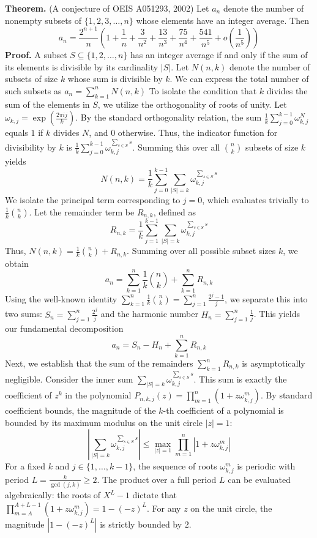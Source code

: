 \textbf{Theorem. } (A conjecture of OEIS A051293, 2002) Let $a_n$ denote the number of nonempty subsets of $\{1, 2, 3, \dots, n\}$ whose elements have an integer average. Then
$$ a_n = \frac{2^{n+1}}{n} \left( 1 + \frac{1}{n} + \frac{3}{n^2} + \frac{13}{n^3} + \frac{75}{n^4} + \frac{541}{n^5} + o\left(\frac{1}{n^5}\right) \right) $$
\textbf{Proof.} A subset $S \subseteq \{1, 2, \dots, n\}$ has an integer average if and only if the sum of its elements is divisible by its cardinality $|S|$. Let $N(n, k)$ denote the number of subsets of size $k$ whose sum is divisible by $k$. We can express the total number of such subsets as $a_n = \sum_{k=1}^n N(n, k)$
To isolate the condition that $k$ divides the sum of the elements in $S$, we utilize the orthogonality of roots of unity. Let $\omega_{k, j} = \exp\left(\frac{2\pi i j}{k}\right)$. By the standard orthogonality relation, the sum $\frac{1}{k} \sum_{j=0}^{k-1} \omega_{k, j}^N$ equals $1$ if $k$ divides $N$, and $0$ otherwise. Thus, the indicator function for divisibility by $k$ is $\frac{1}{k} \sum_{j=0}^{k-1} \omega_{k, j}^{\sum_{s \in S} s}$. Summing this over all $\binom{n}{k}$ subsets of size $k$ yields
$$ N(n, k) = \frac{1}{k} \sum_{j=0}^{k-1} \sum_{|S|=k} \omega_{k, j}^{\sum_{s \in S} s} $$
We isolate the principal term corresponding to $j = 0$, which evaluates trivially to $\frac{1}{k} \binom{n}{k}$. Let the remainder term be $R_{n,k}$, defined as
$$ R_{n,k} = \frac{1}{k} \sum_{j=1}^{k-1} \sum_{|S|=k} \omega_{k, j}^{\sum_{s \in S} s} $$
Thus, $N(n, k) = \frac{1}{k} \binom{n}{k} + R_{n,k}$. Summing over all possible subset sizes $k$, we obtain
$$ a_n = \sum_{k=1}^n \frac{1}{k} \binom{n}{k} + \sum_{k=1}^n R_{n,k} $$
Using the well-known identity $\sum_{k=1}^n \frac{1}{k} \binom{n}{k} = \sum_{j=1}^n \frac{2^j - 1}{j}$, we separate this into two sums: $S_n = \sum_{j=1}^n \frac{2^j}{j}$ and the harmonic number $H_n = \sum_{j=1}^n \frac{1}{j}$. This yields our fundamental decomposition
$$ a_n = S_n - H_n + \sum_{k=1}^n R_{n,k} $$
Next, we establish that the sum of the remainders $\sum_{k=1}^n R_{n,k}$ is asymptotically negligible. 
Consider the inner sum $\sum_{|S|=k} \omega_{k, j}^{\sum_{s \in S} s}$. This sum is exactly the coefficient of $z^k$ in the polynomial $P_{n, k, j}(z) = \prod_{m=1}^n (1 + z \omega_{k, j}^m)$. By standard coefficient bounds, the magnitude of the $k$-th coefficient of a polynomial is bounded by its maximum modulus on the unit circle $|z| = 1$:
$$ \left| \sum_{|S|=k} \omega_{k, j}^{\sum_{s \in S} s} \right| \le \max_{|z|=1} \prod_{m=1}^n |1 + z \omega_{k, j}^m| $$
For a fixed $k$ and $j \in \{1, \dots, k-1\}$, the sequence of roots $\omega_{k, j}^m$ is periodic with period $L = \frac{k}{\gcd(j, k)} \ge 2$. The product over a full period $L$ can be evaluated algebraically: the roots of $X^L - 1$ dictate that $\prod_{m=A}^{A+L-1} (1 + z \omega_{k,j}^m) = 1 - (-z)^L$. For any $z$ on the unit circle, the magnitude $|1 - (-z)^L|$ is strictly bounded by $2$.
